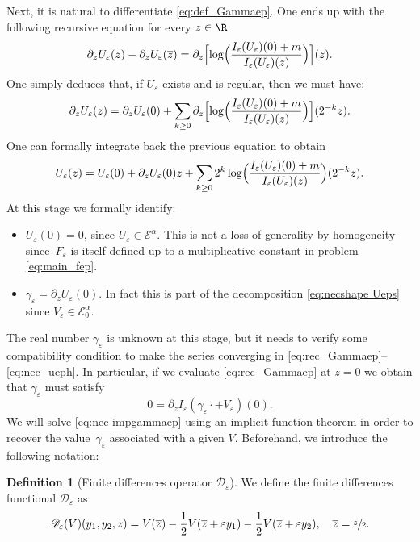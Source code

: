 \documentclass[10pt]{amsart}
\let\mathcal\mathscr
\theoremstyle{plain}
\theoremstyle{definition}
\newtheorem{definition}[thm]{Definition}
\newcommand{\D}{\mathcal{D}_\eps}
\let\eps\varepsilon
\let\ds\displaystyle
\newcommand{\Ea}{\mathcal{E}^\alpha}
\newcommand{\Eaz}{\mathcal{E}^\alpha_0}
\newcommand{\bz}{\overline{z}}
\newcommand{\iep}[1]{I_\varepsilon (U_\varepsilon)(#1)}
\begin{document}
Next, it is natural to differentiate \eqref{eq:def_Gammaep}.
One ends up with the following recursive equation for every $z \in \R$
\begin{equation}\label{eq:rec_Gammaep}
\partial_z U_\eps (z) - \partial_z U_\eps(\bz)= \partial_z \Bigl[ \log \Bigl(\dfrac{I_\eps(U_\eps)(0) + m}{I_\eps(U_\eps)(z)} \Bigr) \Bigr] (z).
\end{equation}
One simply deduces that, if $U_\eps$ exists and is regular, then we must have:
\begin{equation*}
\ds \partial_z U_\eps(z)= \partial_z U_\eps (0) + \sum_{k \geq 0}\partial_z \Bigl[ \log \Bigl(\dfrac{I_\eps(U_\eps)(0) + m}{I_\eps(U_\eps)(z)} \Bigr) \Bigr] (2^{-k}z).
\end{equation*}
One can formally integrate back the previous equation to obtain
\begin{equation}\label{eq:nec_ueph}
\ds U_\eps(z)= U_\eps(0) + \partial_z U_\eps (0)z + \sum_{k\geq 0} 2^k \log \Bigl(\dfrac{\iep{0}+ m}{I_\eps(U_\eps)(z)} \Bigr) (2^{-k}z).
\end{equation}
At this stage we formally identify:
\begin{itemize}
\item $U_\eps(0)=0$, since $U_\eps \in \Ea$. This is not a loss of generality by homogeneity since~$F_\eps$ is itself defined up to a multiplicative constant in problem \eqref{eq:main_fep}.
\item $\gamma_\eps = \partial_z U_\eps(0)$. In fact this is part of the decomposition \eqref{eq:necshape Ueps} since $V_\eps \in \Eaz$.
\end{itemize}
The real number $\gamma_\eps$ is unknown at this stage, but it needs to verify some compatibility condition to make the series converging in \eqref{eq:rec_Gammaep}--\eqref{eq:nec_ueph}. In particular, if we evaluate \eqref{eq:rec_Gammaep} at $z=0$ we obtain that $\gamma_\eps$ must satisfy
\begin{equation}\label{eq:nec impgammaep}
0 = \partial_z I_\eps(\gamma_\eps \cdot + V_\eps) (0).
\end{equation}
We will solve \eqref{eq:nec impgammaep} using an implicit function theorem in order to recover the value~$\gamma_\eps$ associated with a given $V$.
Beforehand, we introduce the following notation:
\begin{definition}[Finite differences operator $\D$]
We define the finite differences functional $\D$ as
\begin{equation*}
\D(V)(y_1,y_2,z) = V(\bz) - \frac12 V(\bz +\eps y_1) - \frac12 V(\bz +\eps y_2), \quad \bz = \sfrac{z}{2}.
\end{equation*}
\end{definition}
\end{document}
